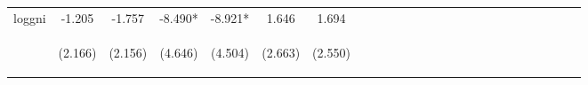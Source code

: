 \documentclass[]{article}
\begin{document}
\begin{center}
\begin{tabular}{lcccccccccccccccccccccccc}
loggni & -1.205 & -1.757 & -8.490* & -8.921* & 1.646 & 1.694 &  &  &  &  &  &  &  &  &  &  &  &  &  &  &  &  &  &  \\
\vspace{4pt} & \begin{footnotesize}(2.166)\end{footnotesize} & \begin{footnotesize}(2.156)\end{footnotesize} & \begin{footnotesize}(4.646)\end{footnotesize} & \begin{footnotesize}(4.504)\end{footnotesize} & \begin{footnotesize}(2.663)\end{footnotesize} & \begin{footnotesize}(2.550)\end{footnotesize} & \begin{footnotesize}\end{footnotesize} & \begin{footnotesize}\end{footnotesize} & \begin{footnotesize}\end{footnotesize} & \begin{footnotesize}\end{footnotesize} & \begin{footnotesize}\end{footnotesize} & \begin{footnotesize}\end{footnotesize} & \begin{footnotesize}\end{footnotesize} & \begin{footnotesize}\end{footnotesize} & \begin{footnotesize}\end{footnotesize} & \begin{footnotesize}\end{footnotesize} & \begin{footnotesize}\end{footnotesize} & \begin{footnotesize}\end{footnotesize} & \begin{footnotesize}\end{footnotesize} & \begin{footnotesize}\end{footnotesize} & \begin{footnotesize}\end{footnotesize} & \begin{footnotesize}\end{footnotesize} & \begin{footnotesize}\end{footnotesize} & \begin{footnotesize}\end{footnotesize} \\

\end{tabular}
\end{center}
\end{document}
